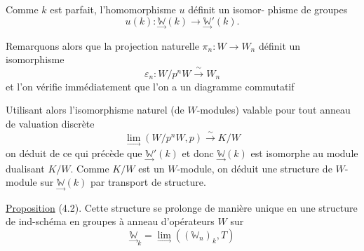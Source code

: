 Comme $k$ est parfait, l'homomorphisme $u$ définit un isomor-%
phisme de groupes
\[ u(k) : \underset{\to}{\mathbb{W}}(k) \to \underset{\to}{\mathbb{W}}'(k) . \]

Remarquons alors que la projection naturelle $\pi_n : W \to W_n$
définit un isomorphisme
\[ \varepsilon_n : W/p^nW \xrightarrow{\ \sim\ } W_n \]
et l'on vérifie immédiatement que l'on a un diagramme commutatif

Utilisant alors l'isomorphisme naturel (de $W$-modules) valable pour tout
anneau de valuation discrète
\[ \underset{\to}{\lim}(W/p^nW,p) \xrightarrow{\ \sim\ } K/W \]
on déduit de ce qui précède que $\underset{\to}{\mathbb{W}}'(k)$ et donc $\underset{\to}{\mathbb{W}}(k)$ est isomorphe
au module dualisant $K/W$. Comme $K/W$ est un $W$-module, on déduit une
structure de $W$-module sur $\underset{\to}{\mathbb{W}}(k)$ par transport de structure.

\uline{Proposition} (4.2). Cette structure se prolonge de manière unique en
une structure de ind-schéma en groupes à anneau d'opérateurs $W$ sur
\[ \underset{\to}{\mathbb{W}}_k = \underset{\to}{\lim}((\mathbb{W}_n)_k , T) \]

